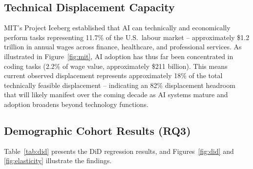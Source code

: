 \documentclass[12pt, a4paper]{article}
\begin{document}
\subsection{Technical Displacement Capacity}

MIT's Project Iceberg \citeyearpar{mit2025} established that AI can technically and
economically perform tasks representing 11.7\% of the U.S.\ labour market --
approximately \$1.2 trillion in annual wages across finance, healthcare, and professional
services. As illustrated in Figure~\ref{fig:mit}, AI adoption has thus far been concentrated
in coding tasks (2.2\% of wage value, approximately \$211 billion). This means current
observed displacement represents approximately 18\% of the total technically feasible
displacement -- indicating an 82\% displacement headroom that will likely manifest over the
coming decade as AI systems mature and adoption broadens beyond technology functions.

\subsection{Demographic Cohort Results (RQ3)}

Table~\ref{tab:did} presents the DiD regression results, and Figures~\ref{fig:did} and
\ref{fig:elasticity} illustrate the findings.
\end{document}

